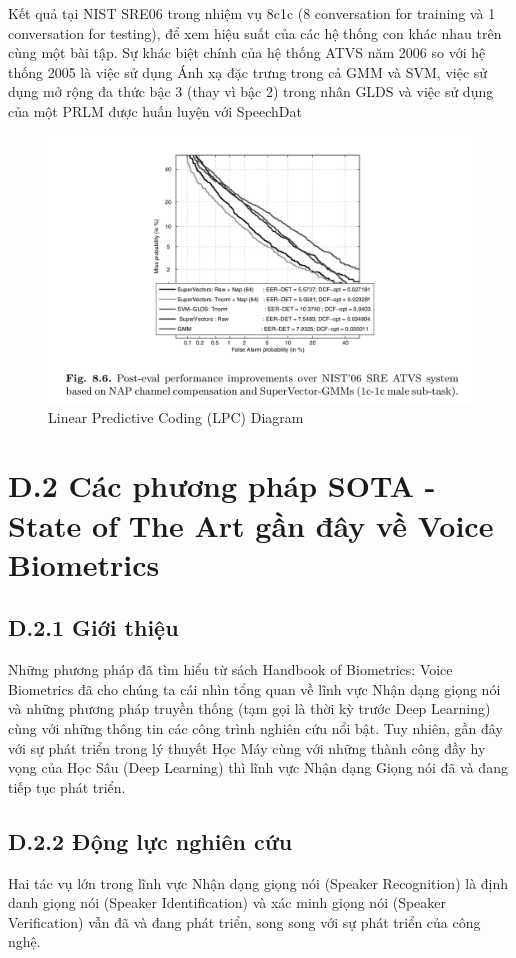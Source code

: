 \documentclass{article}
\begin{document}
	Kết quả tại NIST SRE06 trong nhiệm vụ 8c1c (8 conversation for training và 1 conversation for testing), để xem hiệu suất của các hệ thống con khác nhau trên cùng một bài tập. Sự khác biệt chính của hệ thống ATVS năm 2006 so với hệ thống 2005 là việc sử dụng Ánh xạ đặc trưng trong cả GMM và SVM, việc sử dụng mở rộng đa thức bậc 3 (thay vì bậc 2) trong nhân GLDS và việc sử dụng của một PRLM được huấn luyện với SpeechDat
	
	\begin{figure}[H]
		\centering
		\includegraphics[width=1\linewidth]{images/figure_8_6.png}
		\caption{Linear Predictive Coding (LPC) Diagram}
		\label{fig:writing-thesis}
	\end{figure}

	\section{D.2 Các phương pháp SOTA - State of The Art gần đây về Voice Biometrics}
	\subsection{D.2.1 Giới thiệu}
	Những phương pháp đã tìm hiểu từ sách Handbook of Biometrics: Voice Biometrics đã cho chúng ta cái nhìn tổng quan về lĩnh vực Nhận dạng giọng nói và những phương pháp truyền thống (tạm gọi là thời kỳ trước Deep Learning) cùng với những thông tin các công trình nghiên cứu nổi bật. Tuy nhiên, gần đây với sự phát triển trong lý thuyết Học Máy cùng với những thành công đầy hy vọng của Học Sâu (Deep Learning) thì lĩnh vực Nhận dạng Giọng nói đã và đang tiếp tục phát triển.
	
	\subsection{D.2.2 Động lực nghiên cứu}
	Hai tác vụ lớn trong lĩnh vực Nhận dạng giọng nói (Speaker Recognition) là định danh giọng nói (Speaker Identification) và xác minh giọng nói (Speaker Verification) vẫn đã và đang phát triển, song song với sự phát triển của công nghệ.
	
\end{document}
